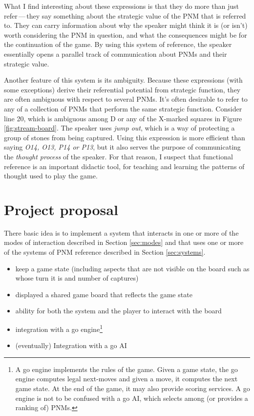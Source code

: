\documentclass{scrartcl}
\begin{document}
What I find interesting about these expressions is that they do more than
just refer\,---\,they say something about the strategic value of the PNM
that is referred to. 
They can carry information about why the speaker might think it is (or isn't)
worth considering the PNM in question, and what the consequences might be for
the continuation of the game.
By using this system of reference, the speaker essentially opens a  
parallel track of communication about PNMs and their strategic value.

Another feature of this system is its ambiguity. 
Because these expressions (with some exceptions) derive their referential
potential from strategic function, they are often ambiguous with respect
to several PNMs.
It's often desirable to refer to any of a collection of PNMs that perform
the same strategic function. Consider line 20, 
which is ambiguous among D or any of the X-marked squares in Figure \ref{fig:stream-board}. 
The speaker uses \textit{jump out}, which is a way of protecting a group of stones from
being captured.
Using this expression is more efficient than saying \textit{O14, O13, P14 or P13},
but it also serves the purpose of communicating the \emph{thought process}
of the speaker.
For that reason, I suspect that functional reference is an important didactic tool,
for teaching and learning the patterns of thought used to play the game.


\section{Project proposal}\label{sec:proposal}

There basic idea is to implement a system that interacts in one or more 
of the modes of interaction described in Section \ref{sec:modes} 
and that uses one or more of the systems of PNM reference described in Section \ref{sec:systems}.

\begin{itemize}
  \item keep a game state (including aspects that are not visible on the board such as whose turn it is and number of captures)
  \item displayed a shared game board that reflects the game state
  \item ability for both the system and the player to interact with the board
  \item integration with a go engine\footnote{A go engine implements the rules of the game.
      Given a game state, the go engine 
      computes legal next-moves and given a move, it computes the next game state.
      At the end of the game, it may also provide scoring services.
      A go engine is not to be confused with a go AI, which selects among (or provides a ranking of)
      PNMs.}
  \item (eventually) Integration with a go AI
\end{itemize}
\end{document}
